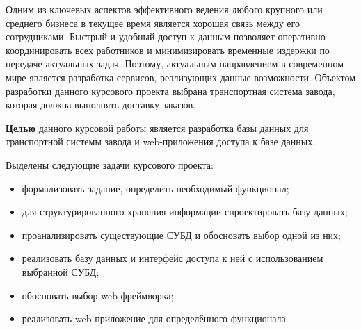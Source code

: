 Одним из ключевых аспектов эффективного ведения любого крупного или среднего бизнеса в текущее время является хорошая связь между его сотрудниками. Быстрый и удобный доступ к данным позволяет оперативно координировать всех работников и минимизировать временные издержки по передаче актуальных задач. Поэтому, актуальным направлением в современном мире является разработка сервисов, реализующих данные возможности. Объектом разработки данного курсового проекта выбрана транспортная система завода, которая должна выполнять доставку заказов.

\textbf{Целью} данного курсовой работы является разработка базы данных для транспортной системы завода и web-приложения доступа к базе данных.

Выделены следующие задачи курсового проекта:
\begin{itemize}
	\item формализовать задание, определить необходимый функционал;
	\item для структурированного хранения информации спроектировать базу данных;
	\item проанализировать существующие СУБД и обосновать выбор одной из них;
	\item реализовать базу данных и интерфейс доступа к ней с использованием выбранной СУБД;
	\item обосновать выбор web-фреймворка;
	\item реализовать web-приложение для определённого функционала.
\end{itemize}

